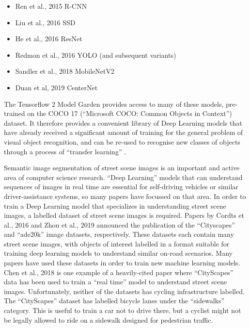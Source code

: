 \documentclass[11pt,twoside]{report}
\begin{document}
\begin{itemize}
\item{Ren et al., 2015 \cite{REN2016} R-CNN}
\item{Liu et al., 2016 \cite{ssd} SSD}
\item{He et al., 2016 \cite{He_2016_CVPR} ResNet}
\item{Redmon et al., 2016 \cite{YOLOv1} YOLO (and subsequent variants)}
\item{Sandler et al., 2018 \cite{MobileNetV2} MobileNetV2}
\item{Duan et al, 2019 \cite{centernet} CenterNet}
\end{itemize}

The Tensorflow 2 Model Garden \cite{zoo} provides access to many of these models, pre-trained on the COCO 17 (``Microsoft COCO: Common Objects in Context'') dataset.  It therefore provides a convenient library of Deep Learning models that have already received a significant amount of training for the general problem of visual object recognition, and can be re-used to recognise new classes of objects through a process of ``transfer learning'' \cite{coco} \cite{transferlearning}.

Semantic image segmentation of street scene images is an important and active area of computer science research.  ``Deep Learning'' models that can understand sequences of images in real time are essential for self-driving vehicles or similar driver-assistance systems, so many papers have focussed on that area.  In order to train a Deep Learning model that specializes in understanding street scene images, a labelled dataset of street scene images is required.  Papers by Cordts et al., 2016 \cite{Cordts_2016_CVPR} and Zhou et al., 2019 \cite{ade20k} announced the publication of the ``Cityscapes'' and ``ade20k'' image datasets, respectively.  These datasets each contain many street scene images, with objects of interest labelled in a format suitable for training deep learning models to understand similar on-road scenarios.  Many papers have used these datasets in order to train new machine learning models.  Chen et al., 2018 \cite{DEEPLAB} is one example of a heavily-cited paper where ``CityScapes'' data has been used to train a ``real time'' model to understand street scene images.  Unfortunately, neither of the datasets has cycling infrastructure labelled.  The ``CityScapes'' dataset has labelled bicycle lanes under the ``sidewalks'' category.  This is useful to train a car not to drive there, but a cyclist might not be legally allowed to ride on a sidewalk designed for pedestrian traffic.  
\end{document}
